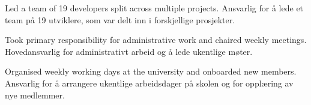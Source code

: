 \cvselected
{}
{}
{}

\begin{cvbullets}
  \item \enor
  {Led a team of 19 developers split across multiple projects.}
  {Ansvarlig for å lede et team på 19 utviklere, som var delt inn i
    forskjellige prosjekter.}
  \item \enor
  {Took primary responsibility for administrative work and chaired
    weekly meetings.}
  {Hovedansvarlig for administrativt arbeid og å lede ukentlige
    møter.}
  \item \enor
  {Organised weekly working days at the university and onboarded new
    members.}
  {Ansvarlig for å arrangere ukentlige arbeidsdager på skolen og for
    opplæring av nye medlemmer.}
\end{cvbullets}
